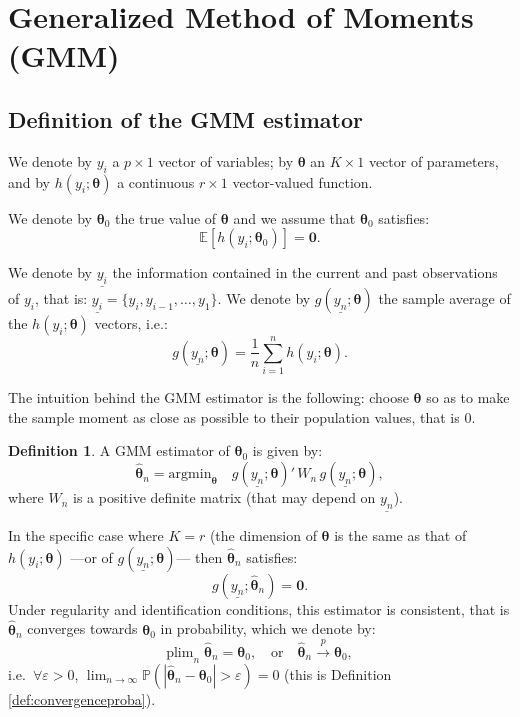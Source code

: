 \documentclass[
  12pt,
]{book}
\theoremstyle{definition}
\newtheorem{definition}{Definition}[chapter]
\theoremstyle{definition}
\theoremstyle{definition}
\theoremstyle{definition}
\theoremstyle{remark}
\begin{document}
\hypertarget{secGMM}{%
\section{Generalized Method of Moments (GMM)}\label{secGMM}}

\hypertarget{definition-of-the-gmm-estimator}{%
\subsection{Definition of the GMM estimator}\label{definition-of-the-gmm-estimator}}

We denote by \(y_i\) a \(p \times 1\) vector of variables; by \(\boldsymbol\theta\) an \(K \times 1\) vector of parameters, and by \(h(y_i;\boldsymbol\theta)\) a continuous \(r \times 1\) vector-valued function.

We denote by \(\boldsymbol\theta_0\) the true value of \(\boldsymbol\theta\) and we assume that \(\boldsymbol\theta_0\) satisfies:
\[
\mathbb{E}[h(y_i;\boldsymbol\theta_0)] = \mathbf{0}.
\]

We denote by \(\underline{y_i}\) the information contained in the current and past observations of \(y_i\), that is: \(\underline{y_i} = \{y_i,y_{i-1},\dots,y_1\}\). We denote by \(g(\underline{y_n};\boldsymbol\theta)\) the sample average of the \(h(y_i;\boldsymbol\theta)\) vectors, i.e.:
\[
g(\underline{y_n};\boldsymbol\theta) = \frac{1}{n} \sum_{i=1}^{n} h(y_i;\boldsymbol\theta).
\]

The intuition behind the GMM estimator is the following: choose \(\boldsymbol\theta\) so as to make the sample moment as close as possible to their population values, that is 0.

\begin{definition}
\protect\hypertarget{def:GMM}{}\label{def:GMM}A GMM estimator of \(\boldsymbol\theta_0\) is given by:
\[
\hat{\boldsymbol\theta}_n = \mbox{argmin}_{\boldsymbol\theta} \quad g(\underline{y_n};\boldsymbol\theta)'\, W_n \, g(\underline{y_n};\boldsymbol\theta),
\]
where \(W_n\) is a positive definite matrix (that may depend on \(\underline{y_n}\)).
\end{definition}

In the specific case where \(K = r\) (the dimension of \(\boldsymbol\theta\) is the same as that of \(h(y_i;\boldsymbol\theta)\) ---or of \(g(\underline{y_n};\boldsymbol\theta)\)--- then \(\hat{\boldsymbol\theta}_n\) satisfies:
\[
g(\underline{y_n};\hat{\boldsymbol\theta}_n) = \mathbf{0}.
\]
Under regularity and identification conditions, this estimator is consistent, that is \(\hat{\boldsymbol\theta}_{n}\) converges towards \(\boldsymbol\theta_0\) in probability, which we denote by:
\begin{equation}
\mbox{plim}_n\;\hat{\boldsymbol\theta}_{n}= \boldsymbol\theta_0,\quad \mbox{or} \quad\hat{\boldsymbol\theta}_{n} \overset{p}{\rightarrow} \boldsymbol\theta_0,\label{eq:consistGMM}
\end{equation}
i.e.~\(\forall \varepsilon>0\), \(\lim_{n \rightarrow \infty} \mathbb{P}(|\hat{\boldsymbol\theta}_{n} - \boldsymbol\theta_0|>\varepsilon) = 0\) (this is Definition \ref{def:convergenceproba}).
\end{document}
